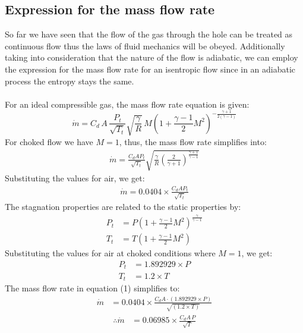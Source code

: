 \documentclass[a4paper, 14pt]{extarticle}
\begin{document}
\subsection{Expression for the mass flow rate}
So far we have seen that the flow of the gas through the hole can be treated as continuous flow thus the laws of  fluid mechanics will be obeyed. Additionally taking into consideration that the nature of the flow is adiabatic, we can employ the expression for the mass flow rate for an isentropic flow since in an adiabatic process the entropy stays the same.\\ \\
For an ideal compressible gas, the mass flow rate equation is given\citep{nasa_cal}\citep{albright2010}:
$$ \dot{m} = C_d\,A\, \frac{P_t}{\sqrt{T_t}} \sqrt{\frac{\gamma}{R}} \, M \left( 1 + \frac{\gamma - 1}{2} M^2 \right)^{-\frac{\gamma + 1}{2(\gamma - 1)}} $$
For choked flow we have $M = 1$, thus,  the mass flow rate simplifies into:
\begin{align*}
    \dot{m} = \frac{C_dA P_t}{\sqrt{T_t}} \sqrt{\frac{\gamma}{R} \left( \frac{2}{\gamma + 1} \right)^{\frac{\gamma + 1}{\gamma - 1}}}
\end{align*}
Substituting the values for air, we get:
\begin{align}
    \dot{m} = 0.0404 \times \frac{C_dA P_t}{\sqrt{T_t}}
\end{align}
The stagnation properties are related to the static properties by:
\begin{align*}
    P_t &= P \left( 1 + \frac{\gamma - 1}{2} M^2 \right)^{\frac{\gamma}{\gamma - 1}} \\
    T_t &= T \left( 1 + \frac{\gamma - 1}{2} M^2 \right)
\end{align*}
Substituting the values for air at choked conditions where \( M = 1 \), we get:
\begin{align*}
    P_t &= 1.892929 \times P \\
    T_t &= 1.2 \times T
\end{align*}
The mass flow rate in equation (1) simplifies to:
\begin{align*}
    \dot{m} &= 0.0404\times \frac{C_d A\cdot (1.892929 \times P) }{\sqrt{(1.2 \times T)}}
\end{align*}
\begin{align}
    \therefore \dot{m} &= 0.06985\times \frac{C_d A\,P}{\sqrt{T}}
\end{align}
\end{document}
